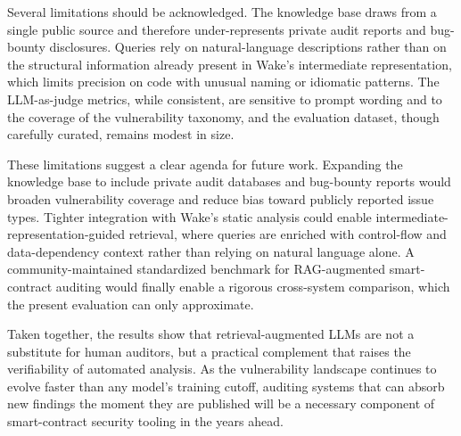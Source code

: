 Several limitations should be acknowledged. The knowledge base draws from a single public source and therefore under-represents private audit reports and bug-bounty disclosures. Queries rely on natural-language descriptions rather than on the structural information already present in Wake's intermediate representation, which limits precision on code with unusual naming or idiomatic patterns. The LLM-as-judge metrics, while consistent, are sensitive to prompt wording and to the coverage of the vulnerability taxonomy, and the evaluation dataset, though carefully curated, remains modest in size.

These limitations suggest a clear agenda for future work. Expanding the knowledge base to include private audit databases and bug-bounty reports would broaden vulnerability coverage and reduce bias toward publicly reported issue types. Tighter integration with Wake's static analysis could enable intermediate-representation-guided retrieval, where queries are enriched with control-flow and data-dependency context rather than relying on natural language alone. A community-maintained standardized benchmark for RAG-augmented smart-contract auditing would finally enable a rigorous cross-system comparison, which the present evaluation can only approximate.

Taken together, the results show that retrieval-augmented LLMs are not a substitute for human auditors, but a practical complement that raises the verifiability of automated analysis. As the vulnerability landscape continues to evolve faster than any model's training cutoff, auditing systems that can absorb new findings the moment they are published will be a necessary component of smart-contract security tooling in the years ahead.

